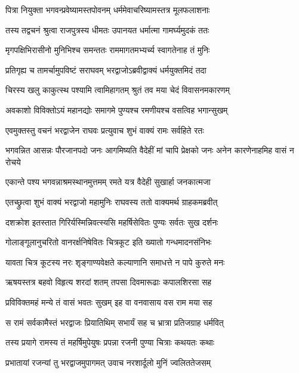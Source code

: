 \twolineshloka
{पित्रा नियुक्ता भगवन्प्रवेष्यामस्तपोवनम्}
{धर्ममेवाचरिष्यामस्तत्र मूलफलाशनाः} %

\twolineshloka
{तस्य तद्वचनं श्रुत्वा राजपुत्रस्य धीमतः}
{उपानयत धर्मात्मा गामर्घ्यमुदकं ततः} %

\twolineshloka
{मृगपक्षिभिरासीनो मुनिभिश्च समन्ततः}
{राममागतमभ्यर्च्य स्वागतेनाह तं मुनिः} %

\twolineshloka
{प्रतिगृह्य च तामर्चामुपविष्टं सराघवम्}
{भरद्वाजोऽब्रवीद्वाक्यं धर्मयुक्तमिदं तदा} %

\twolineshloka
{चिरस्य खलु काकुत्स्थ पश्यामि त्वामिहागतम्}
{श्रुतं तव मया चेदं विवासनमकारणम्} %

\twolineshloka
{अवकाशो विविक्तोऽयं महानद्योः समागमे}
{पुण्यश्च रमणीयश्च वसत्विह भगान्सुखम्} %

\twolineshloka
{एवमुक्तस्तु वचनं भरद्वाजेन राघवः}
{प्रत्युवाच शुभं वाक्यं रामः सर्वहिते रतः} %

\threelineshloka
{भगवन्नित आसन्नः पौरजानपदो जनः}
{आगमिष्यति वैदेहीं मां चापि प्रेक्षको जनः}
{अनेन कारणेनाहमिह वासं न रोचये} %

\twolineshloka
{एकान्ते पश्य भगवन्नाश्रमस्थानमुत्तमम्}
{रमते यत्र वैदेही सुखार्हा जनकात्मजा} %

\twolineshloka
{एतच्छ्रुत्वा शुभं वाक्यं भरद्वाजो महामुनिः}
{राघवस्य ततो वाक्यमर्थ ग्राहकमब्रवीत्} %

\twolineshloka
{दशक्रोश इतस्तात गिरिर्यस्मिन्निवत्स्यसि}
{महर्षिसेवितः पुण्यः सर्वतः सुख दर्शनः} %

\twolineshloka
{गोलाङ्गूलानुचरितो वानरर्क्षनिषेवितः}
{चित्रकूट इति ख्यातो गन्धमादनसंनिभः} %

\twolineshloka
{यावता चित्र कूटस्य नरः शृङ्गाण्यवेक्षते}
{कल्याणानि समाधत्ते न पापे कुरुते मनः} %

\twolineshloka
{ऋषयस्तत्र बहवो विहृत्य शरदां शतम्}
{तपसा दिवमारूढाः कपालशिरसा सह} %

\twolineshloka
{प्रविविक्तमहं मन्ये तं वासं भवतः सुखम्}
{इह वा वनवासाय वस राम मया सह} %

\twolineshloka
{स रामं सर्वकामैस्तं भरद्वाजः प्रियातिथिम्}
{सभार्यं सह च भ्रात्रा प्रतिजग्राह धर्मवित्} %

\twolineshloka
{तस्य प्रयागे रामस्य तं महर्षिमुपेयुषः}
{प्रपन्ना रजनी पुण्या चित्राः कथयतः कथाः} %

\twolineshloka
{प्रभातायां रजन्यां तु भरद्वाजमुपागमत्}
{उवाच नरशार्दूलो मुनिं ज्वलिततेजसम्} %


